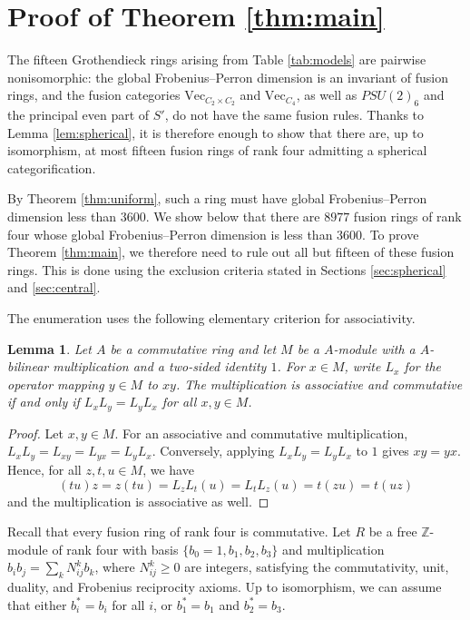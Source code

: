 \documentclass[11pt]{amsart}
\newtheorem{lemma}[theorem]{Lemma}
\theoremstyle{definition}
\newcommand{\Z}{\mathbb Z}
\numberwithin{equation}{section}
\begin{document}
\section{Proof of Theorem \ref{thm:main}}\label{sec:established}

The fifteen Grothendieck rings arising from Table \ref{tab:models} are pairwise nonisomorphic: the global Frobenius--Perron dimension is an invariant of fusion rings, and the fusion categories $\mathrm{Vec}_{C_2\times C_2}$ and $\mathrm{Vec}_{C_4}$, as well as $PSU(2)_6$ and the principal even part of $S'$, do not have the same fusion rules. 
Thanks to Lemma \ref{lem:spherical}, it is therefore enough to show that there are, up to isomorphism, at most fifteen fusion rings of rank four admitting a spherical categorification. 

By Theorem \ref{thm:uniform}, such a ring must have global Frobenius--Perron dimension less than $3600$. 
We show below that there are $8977$ fusion rings of rank four whose global Frobenius--Perron dimension is less than $3600$.
To prove Theorem \ref{thm:main}, we therefore need to rule out all but fifteen of these fusion rings. 
This is done using the exclusion criteria stated in Sections \ref{sec:spherical} and \ref{sec:central}. 

The enumeration uses the following elementary criterion for associativity. 

\begin{lemma}\label{lem:commuting-multiplication}
Let $A$ be a commutative ring and let $M$ be a $A$-module with a
$A$-bilinear multiplication and a two-sided identity $1$. For $x\in M$,
write $L_x$ for the operator mapping $y\in M$ to $xy$. The multiplication is associative and commutative
if and only if $L_xL_y=L_yL_x$ for all $x,y\in M$.
\end{lemma}
\begin{proof}
Let $x,y\in M$. 
For an associative and commutative multiplication,
$L_xL_y=L_{xy}=L_{yx}=L_yL_x$. Conversely, applying $L_xL_y=L_yL_x$ to $1$
gives $xy=yx$. Hence, for all $z,t,u \in M$, we have 
\[
 (tu)z=z(tu)=L_zL_t(u)=L_tL_z(u)=t(zu)=t(uz)
\]
and the multiplication is associative as well.
\end{proof}

Recall that every fusion ring of rank four is commutative. 
Let $R$ be a free $\Z$-module of rank four with basis $\{b_0=1, b_1,b_2,b_3\}$ and multiplication $b_ib_j=\sum_k N_{ij}^k b_k$, where $N_{ij}^k \geq 0$ are integers, satisfying the commutativity, unit, duality, and Frobenius reciprocity axioms. 
Up to isomorphism, we can assume that either $b_i^*=b_i$ for all $i$, or $b_1^*=b_1$ and $b_2^*=b_3$. 
\end{document}
